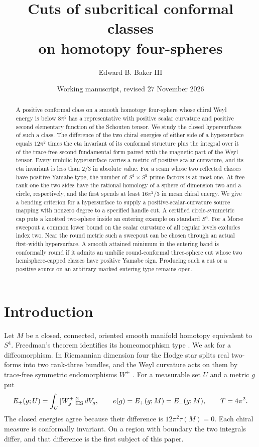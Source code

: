 \documentclass[11pt,letterpaper]{article}
\title{Cuts of subcritical conformal classes\\on homotopy four-spheres}
\author{Edward B. Baker III}
\date{Working manuscript, revised 27 November 2026}
\numberwithin{equation}{section}
\theoremstyle{definition}
\begin{document}
\maketitle
\begin{abstract}
A positive conformal class on a smooth homotopy four-sphere whose chiral
Weyl energy is below \(8\pi^2\) has a representative with positive scalar
curvature and positive second elementary function of the Schouten tensor.
We study the closed hypersurfaces of such a class. The difference of the
two chiral energies of either side of a hypersurface equals
\(12\pi^2\) times the eta invariant of its conformal structure plus the
integral over it of the trace-free second fundamental form paired with the
magnetic part of the Weyl tensor. Every umbilic hypersurface carries a
metric of positive scalar curvature, and its eta invariant is less than
\(2/3\) in absolute value. For a seam whose two reflected classes have positive Yamabe type,
the number of \(S^1\times S^2\) prime factors is at most one. At free rank
one the two sides have the rational homology of a sphere of dimension
two and a circle, respectively, and the first spends at least \(16\pi^2/3\)
in mean chiral energy. We give a bending criterion for a hypersurface to
supply a positive-scalar-curvature source mapping with nonzero degree to
a specified handle cut. A certified circle-symmetric cap puts a knotted
two-sphere inside an entering example on standard \(S^4\). For a Morse
sweepout a common lower bound on the scalar curvature of all regular
levels excludes index two. Near the round metric such a sweepout can be
chosen through an actual first-width hypersurface. A smooth attained minimum in the
entering band is conformally round if it admits an umbilic round-conformal
three-sphere cut whose two hemisphere-capped classes have positive Yamabe
sign. Producing such a cut or a positive source on an arbitrary marked
entering type remains open.
\end{abstract}

\section{Introduction}

Let \(M\) be a closed, connected, oriented smooth manifold homotopy
equivalent to \(S^4\). Freedman's theorem identifies its homeomorphism
type \cite{Freedman1982}. We ask for a diffeomorphism. In Riemannian
dimension four the Hodge star splits real two-forms into two rank-three
bundles, and the Weyl curvature acts on them by trace-free symmetric
endomorphisms \(W^\pm\) \cite{AHS1978}. For a measurable set \(U\) and a
metric \(g\) put
\[
 E_\pm(g;U)=\int_U|W^\pm_g|_{\rm HS}^2\,dV_g,\qquad
 e(g)=E_+(g;M)=E_-(g;M),\qquad T=4\pi^2 .
\]
The closed energies agree because their difference is \(12\pi^2\tau(M)=0\).
Each chiral measure is conformally invariant. On a region with boundary
the two integrals differ, and that difference is the first subject of
this paper.
\end{document}
